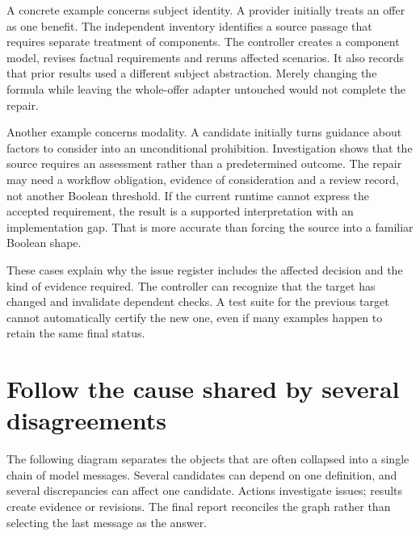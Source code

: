 \documentclass[12pt,a4paper,oneside,openany]{book}
\begin{document}
A concrete example concerns subject identity. A provider initially treats an
offer as one benefit. The independent inventory identifies a source passage that
requires separate treatment of components. The controller creates a component
model, revises factual requirements and reruns affected scenarios. It also records
that prior results used a different subject abstraction. Merely changing the
formula while leaving the whole-offer adapter untouched would not complete the
repair.

Another example concerns modality. A candidate initially turns guidance about
factors to consider into an unconditional prohibition. Investigation shows that
the source requires an assessment rather than a predetermined outcome. The repair
may need a workflow obligation, evidence of consideration and a review record,
not another Boolean threshold. If the current runtime cannot express the accepted
requirement, the result is a supported interpretation with an implementation gap.
That is more accurate than forcing the source into a familiar Boolean shape.

These cases explain why the issue register includes the affected decision and the
kind of evidence required. The controller can recognize that the target has
changed and invalidate dependent checks. A test suite for the previous target
cannot automatically certify the new one, even if many examples happen to retain
the same final status.

\section{Follow the cause shared by several disagreements}
\label{merge:M06:11}


The following diagram separates the objects that are often collapsed into a
single chain of model messages. Several candidates can depend on one definition,
and several discrepancies can affect one candidate. Actions investigate issues;
results create evidence or revisions. The final report reconciles the graph rather
than selecting the last message as the answer.
\end{document}
